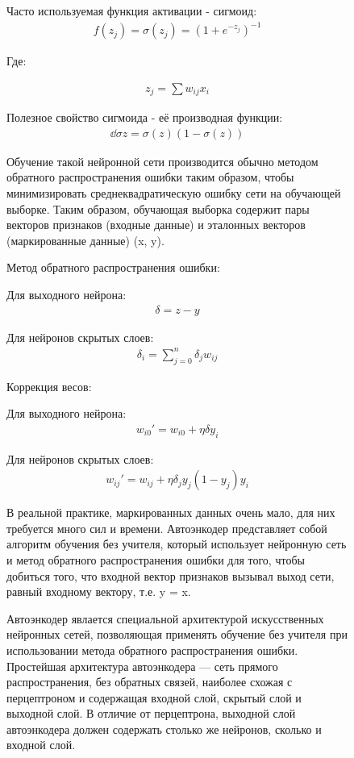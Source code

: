 \documentclass[12pt]{article}
\begin{document}
\begin{figure}[h]
Часто используемая функция активации - сигмоид:
  \begin{align}
	f(z_j)=\sigma(z_j)=(1+e^{-z_j})^{-1}
  \end{align}

Где:

  \begin{align}
	z_j=\sum{{w_{ij}}{x_i}}
  \end{align}

Полезное свойство сигмоида - её производная функции:
  \begin{align}
	\dd{\sigma}z=\sigma(z)(1-\sigma(z))
  \end{align}

Обучение такой нейронной сети производится обычно методом обратного распространения ошибки таким образом, чтобы минимизировать среднеквадратическую ошибку сети на обучающей выборке. Таким образом, обучающая выборка содержит пары векторов признаков (входные данные) и эталонных векторов (маркированные данные) {(x, y)}.

Метод обратного распространения ошибки:

Для выходного нейрона:
  \begin{align}
	\delta=z-y
  \end{align}

Для нейронов скрытых слоев:
  \begin{align}
	\delta_i=\sum_{j=0}^n \delta_j w_{ij}
  \end{align}

Коррекция весов:

Для выходного нейрона:
  \begin{align}
	w_{i0}'=w_{i0}+\eta\delta y_i
  \end{align}

Для нейронов скрытых слоев:
  \begin{align}
	w_{ij}'=w_{ij}+\eta\delta_j y_j(1-y_j)y_i
  \end{align}

В реальной практике, маркированных данных очень мало, для них требуется много сил и времени. Автоэнкодер представляет собой алгоритм обучения без учителя, который использует нейронную сеть и метод обратного распространения ошибки для того, чтобы добиться того, что входной вектор признаков вызывал выход сети, равный входному вектору, т.е. y = x.

Автоэнкодер явлается специальной архитектурой искусственных нейронных сетей, позволяющая применять обучение без учителя при использовании метода обратного распространения ошибки. Простейшая архитектура автоэнкодера — сеть прямого распространения, без обратных связей, наиболее схожая с перцептроном и содержащая входной слой, скрытый слой и выходной слой. В отличие от перцептрона, выходной слой автоэнкодера должен содержать столько же нейронов, сколько и входной слой.


\end{figure}
\end{document}
